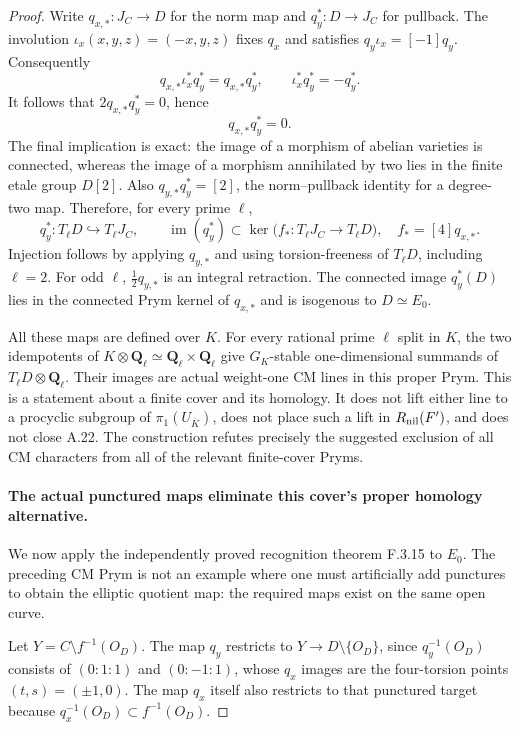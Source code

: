\begin{proof}
Write $q_{x,*}:J_C\to D$ for the norm map and $q_y^*:D\to J_C$ for pullback. The involution $\iota_x(x,y,z)=(-x,y,z)$ fixes $q_x$ and satisfies $q_y\iota_x=[-1]q_y$. Consequently
\[
 q_{x,*}\iota_x^*q_y^*=q_{x,*}q_y^*,\qquad
 \iota_x^*q_y^*=-q_y^*.
\]
It follows that $2q_{x,*}q_y^*=0$, hence
\[
 q_{x,*}q_y^*=0.
\]
The final implication is exact: the image of a morphism of abelian varieties is connected, whereas the image of a morphism annihilated by two lies in the finite etale group $D[2]$. Also $q_{y,*}q_y^*=[2]$, the norm--pullback identity for a degree-two map. Therefore, for every prime $\ell$,
\[
 q_y^*:T_\ell D\hookrightarrow T_\ell J_C,
 \qquad \operatorname{im}(q_y^*)\subset
 \ker\bigl(f_*:T_\ell J_C\to T_\ell D\bigr),
 \quad f_*=[4]q_{x,*}.
\]
Injection follows by applying $q_{y,*}$ and using torsion-freeness of $T_\ell D$, including $\ell=2$. For odd $\ell$, $\tfrac12q_{y,*}$ is an integral retraction. The connected image $q_y^*(D)$ lies in the connected Prym kernel of $q_{x,*}$ and is isogenous to $D\simeq E_0$.

All these maps are defined over $K$. For every rational prime $\ell$ split in $K$, the two idempotents of $K\otimes\mathbf Q_\ell\simeq\mathbf Q_\ell\times\mathbf Q_\ell$ give $G_K$-stable one-dimensional summands of $T_\ell D\otimes\mathbf Q_\ell$. Their images are actual weight-one CM lines in this proper Prym. This is a statement about a finite cover and its homology. It does not lift either line to a procyclic subgroup of $\pi_1(U_{\overline K})$, does not place such a lift in $R_{\rm nil}(F')$, and does not close A.22. The construction refutes precisely the suggested exclusion of all CM characters from all of the relevant finite-cover Pryms.

\paragraph{The actual punctured maps eliminate this cover's proper homology alternative.}
We now apply the independently proved recognition theorem F.3.15 to $E_0$. The preceding CM Prym is not an example where one must artificially add punctures to obtain the elliptic quotient map: the required maps exist on the same open curve.

Let $Y=C\setminus f^{-1}(O_D)$. The map $q_y$ restricts to $Y\to D\setminus\{O_D\}$, since $q_y^{-1}(O_D)$ consists of $(0:1:1)$ and $(0:-1:1)$, whose $q_x$ images are the four-torsion points $(t,s)=(\pm1,0)$. The map $q_x$ itself also restricts to that punctured target because $q_x^{-1}(O_D)\subset f^{-1}(O_D)$.


\end{proof}
